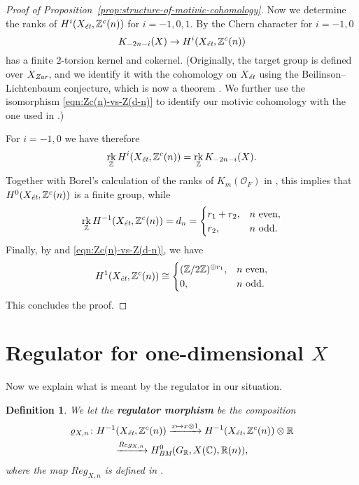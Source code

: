 \documentclass{article}
\DeclareMathOperator{\rk}{rk}
\newcommand{\CC}{\mathbb{C}}
\newcommand{\RR}{\mathbb{R}}
\newcommand{\ZZ}{\mathbb{Z}}
\newcommand{\BM}{\text{\it BM}}
\newcommand{\et}{\text{\it \'{e}t}}
\newcommand{\Zar}{\text{\it Zar}}
\theoremstyle{myplain}
\theoremstyle{mydefinition}
\newtheorem{definition}[theorem]{Definition}
\begin{document}
\begin{proof}[Proof of Proposition~\ref{prop:structure-of-motivic-cohomology}]
  Now we determine the ranks of $H^i (X_\et, \ZZ^c (n))$ for $i = -1,0,1$.
  By \cite[Proposition~2.1]{Kolster-Sands-2008} the Chern character for
  $i = -1,0$
  $$K_{-2n - i} (X) \to H^i (X_\et, \ZZ^c(n))$$
  has a finite $2$-torsion kernel and cokernel.
  (Originally, the target group is defined over $X_\Zar$, and we identify it
  with the cohomology on $X_\et$ using the Beilinson--Lichtenbaum conjecture,
  which is now a theorem \cite[Theorem~1.2]{Geisser-2004-Dedekind}. We further
  use the isomorphism \eqref{eqn:Zc(n)-vs-Z(d-n)} to identify our motivic
  cohomology with the one used in \cite{Kolster-Sands-2008}.)

  For $i = -1,0$ we have therefore
  $$\rk_\ZZ H^i (X_\et, \ZZ^c(n)) = \rk_\ZZ K_{-2n - i} (X).$$
  Together with Borel's calculation of the ranks of $K_m (\mathcal{O}_F)$ in \cite{Borel-1974}, this implies that
  $H^0 (X_\et, \ZZ^c (n))$ is a finite group, while
  \[ \rk_\ZZ H^{-1} (X_\et, \ZZ^c(n)) = d_n =
    \begin{cases}
      r_1 + r_2, & n \text{ even}, \\
      r_2, & n \text{ odd}.
    \end{cases} \]
  Finally, by \cite[p.\,179]{Kolster-Sands-2008} and
  \eqref{eqn:Zc(n)-vs-Z(d-n)}, we have
  \[ H^1 (X_\et, \ZZ^c(n)) \cong
    \begin{cases}
      (\ZZ/2\ZZ)^{\oplus r_1}, & n\text{ even}, \\
      0, & n\text{ odd}.
    \end{cases} \]
  This concludes the proof.
\end{proof}


\section{Regulator for one-dimensional $X$}
\label{sec:regulators}

Now we explain what is meant by the regulator in our situation.

\begin{definition}
  We let the \textbf{regulator morphism} be the composition
  \begin{multline*}
    \varrho_{X,n}\colon
    H^{-1} (X_\et, \ZZ^c (n)) \xrightarrow{x \mapsto x\otimes 1}
    H^{-1} (X_\et, \ZZ^c (n)) \otimes \RR \\
    \xrightarrow{Reg_{X,n}} H^0_\BM (G_\RR, X(\CC), \RR(n)),
  \end{multline*}
  where the map $Reg_{X,n}$ is defined in \cite[\S 2]{Beshenov-Weil-etale-2}.
\end{definition}
\end{document}
